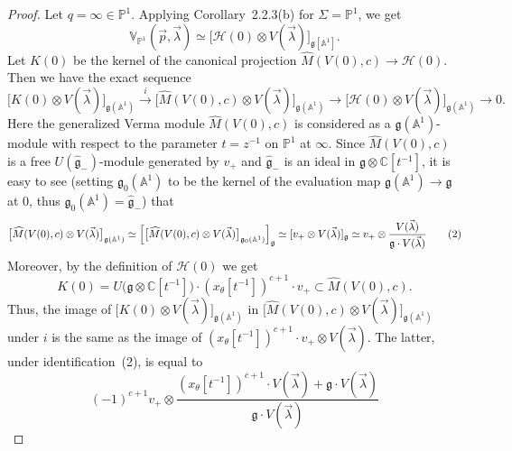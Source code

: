 \documentclass[12pt]{article}
\begin{document}
\begin{proof}
    Let $q=\infty\in\mathbb{P}^1$. Applying Corollary~2.2.3(b) for $\Sigma=\mathbb{P}^1$, we get
    \[
        \mathbb{V}_{\mathbb{P}^1}(\vec{p},\vec{\lambda})
        \simeq
        \bigl[\mathcal{H}(0)\otimes V(\vec{\lambda})\bigr]_{\mathfrak g[\mathbb{A}^1]}.
        \tag{1}
    \]
    Let $K(0)$ be the kernel of the canonical projection $\widehat M(V(0),c)\to\mathcal{H}(0)$.
    Then we have the exact sequence
    \[
        \bigl[K(0)\otimes V(\vec{\lambda})\bigr]_{\mathfrak g(\mathbb{A}^1)}
        \xrightarrow{i}
        \bigl[\widehat M(V(0),c)\otimes V(\vec{\lambda})\bigr]_{\mathfrak g(\mathbb{A}^1)}
        \longrightarrow
        \bigl[\mathcal{H}(0)\otimes V(\vec{\lambda})\bigr]_{\mathfrak g(\mathbb{A}^1)}
        \to 0.
        \tag{$*$}
    \]
    Here the generalized Verma module $\widehat M(V(0),c)$ is considered as a $\mathfrak g(\mathbb{A}^1)$-module
    with respect to the parameter $t = z^{-1}$ on $\mathbb{P}^1$ at $\infty$.
    Since $\widehat M(V(0),c)$ is a free $U(\widehat{\mathfrak g}_-)$-module generated by $v_+$
    and $\widehat{\mathfrak g}_-$ is an ideal in $\mathfrak g\otimes\mathbb{C}[t^{-1}]$,
    it is easy to see (setting $\mathfrak g_0(\mathbb{A}^1)$ to be the kernel of the evaluation map $\mathfrak g(\mathbb{A}^1)\to\mathfrak g$ at $0$,
    thus $\mathfrak g_0(\mathbb{A}^1)=\widehat{\mathfrak g}_-$) that
    \[
        \bigl[\widehat M(V(0),c)\otimes V(\vec{\lambda})\bigr]_{\mathfrak g(\mathbb{A}^1)}
        \simeq
        \Bigl[\bigl[\widehat M(V(0),c)\otimes V(\vec{\lambda})\bigr]_{\mathfrak g_0(\mathbb{A}^1)}\Bigr]_{\mathfrak g}
        \simeq
        [v_+\otimes V(\vec{\lambda})]_{\mathfrak g}
        \simeq
        v_+\otimes\frac{V(\vec{\lambda})}{\mathfrak g\cdot V(\vec{\lambda})}
        \tag{2}
    \]
    Moreover, by the definition of $\mathcal{H}(0)$ we get
    \[
        K(0)
        =
        U\bigl(\mathfrak g\otimes\mathbb{C}[t^{-1}]\bigr)
        \cdot(x_\theta[t^{-1}])^{c+1}\cdot v_+
        \subset
        \widehat M(V(0),c).
    \]
    Thus, the image of
    $\bigl[K(0)\otimes V(\vec{\lambda})\bigr]_{\mathfrak g(\mathbb{A}^1)}$
    in $\bigl[\widehat M(V(0),c)\otimes V(\vec{\lambda})\bigr]_{\mathfrak g(\mathbb{A}^1)}$
    under $i$ is the same as the image of $(x_\theta[t^{-1}])^{c+1}\cdot v_+\otimes V(\vec{\lambda})$.
    The latter, under identification~(2), is equal to
    \[
        (-1)^{c+1}v_+\otimes
        \frac{(x_\theta[t^{-1}])^{c+1}\cdot V(\vec{\lambda})+\mathfrak g\cdot V(\vec{\lambda})}
        {\mathfrak g\cdot V(\vec{\lambda})}
\]
\end{proof}
\end{document}
